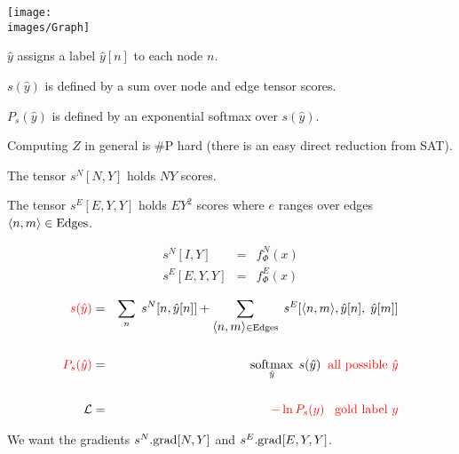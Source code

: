 {
\centerline{\texttt{[image: \\images/Graph]}}
\medskip
$\hat{y} $ assigns a label $\hat{y}[n]$ to each node $n$.

\vfill
$s(\hat{y})$ is defined by a sum over node and edge tensor scores.

\vfill
$P_s(\hat{y})$ is defined by an exponential softmax over $s(\hat{y})$.

\vfill
Computing $Z$ in general is \#P hard (there is an easy direct reduction from SAT).


The tensor {\color{red} $s^N[N,Y]$} holds $NY$ scores.

\vfill
The tensor {\color{red} $s^E[E,Y,Y]$} holds $EY^2$ scores where $e$ ranges over edges ${\mbox{$\langle n,m\rangle$}} \in \mathrm{Edges}$.


\begin{eqnarray*}
s^N[I,Y] & = & f^N_\Phi(x) \\
s^E[E,Y,Y] & = & f^E_\Phi(x)
\end{eqnarray*}

\vfill
\begin{eqnarray*}
{\color{red} s(\hat{y})} & = & \sum_n\;s^N[n,\hat{y}[n]] + \sum_{{\mbox{$\langle n,m\rangle$}} \in \mathrm{Edges}}\;s^E[{\mbox{$\langle n,m\rangle$}},\hat{y}[n],\;\hat{y}[m]] \\
\\
{\color{red} P_s(\hat{y})} & = & \operatorname*{softmax}_{\hat{y}}\;s(\hat{y}) \;\;\mbox{\color{red} all possible $\hat{y}$} \\
\\
{\cal L} & = & {\color{red} - \ln P_s(y) \;\;\;\mbox{gold label $y$}}
\end{eqnarray*}

\vfill
We want the gradients {\color{red} $s^N.\mathrm{grad}[N,Y]$} and {\color{red} $s^E.\mathrm{grad}[E,Y,Y]$}.



}


